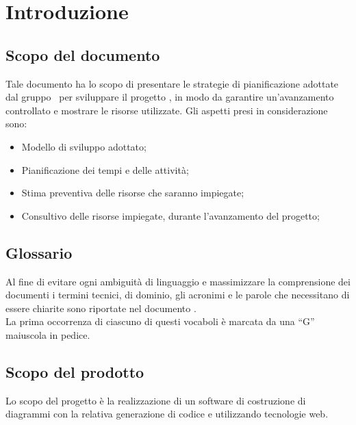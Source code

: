 \documentclass[../PianoDiProgetto.tex]{subfiles}
\begin{document}
	\section{Introduzione}
		\subsection{Scopo del documento}
			Tale documento ha lo scopo di presentare le strategie di pianificazione adottate
			dal gruppo \kaleidoscode\  per sviluppare il progetto \progetto, in modo	da garantire un'avanzamento controllato e mostrare le risorse utilizzate.
			Gli aspetti presi in considerazione sono:
			\begin{itemize}
				\item Modello di sviluppo adottato;
				\item Pianificazione dei tempi e delle attività;
				\item Stima preventiva delle risorse che saranno impiegate;
				\item Consultivo delle risorse impiegate, durante l'avanzamento del progetto;
			\end{itemize}
		\subsection{Glossario}
		Al fine di evitare ogni ambiguità di linguaggio e massimizzare la
		comprensione dei documenti i termini tecnici, di dominio, gli
		acronimi e le parole che necessitano di essere chiarite sono
		riportate nel documento \glossariov.\\
		La prima occorrenza di ciascuno di questi vocaboli è
		marcata da una ``G'' maiuscola in pedice.
		\subsection{Scopo del prodotto}
			Lo scopo del progetto è la realizzazione di un software di
			costruzione di diagrammi  con la relativa generazione
			di codice  e  utilizzando tecnologie
			web.
\end{document}
